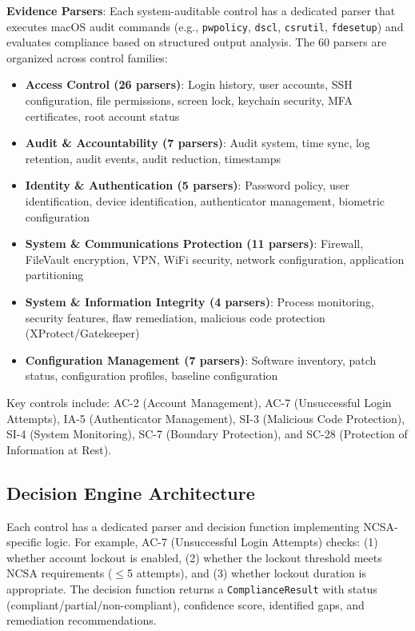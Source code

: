 \documentclass[11pt,conference]{IEEEtran}
\begin{document}
\textbf{Evidence Parsers}: Each system-auditable control has a dedicated parser that executes macOS audit commands (e.g., \texttt{pwpolicy}, \texttt{dscl}, \texttt{csrutil}, \texttt{fdesetup}) and evaluates compliance based on structured output analysis. The 60 parsers are organized across control families:
\begin{itemize}
    \item \textbf{Access Control (26 parsers)}: Login history, user accounts, SSH configuration, file permissions, screen lock, keychain security, MFA certificates, root account status
    \item \textbf{Audit \& Accountability (7 parsers)}: Audit system, time sync, log retention, audit events, audit reduction, timestamps
    \item \textbf{Identity \& Authentication (5 parsers)}: Password policy, user identification, device identification, authenticator management, biometric configuration
    \item \textbf{System \& Communications Protection (11 parsers)}: Firewall, FileVault encryption, VPN, WiFi security, network configuration, application partitioning
    \item \textbf{System \& Information Integrity (4 parsers)}: Process monitoring, security features, flaw remediation, malicious code protection (XProtect/Gatekeeper)
    \item \textbf{Configuration Management (7 parsers)}: Software inventory, patch status, configuration profiles, baseline configuration
\end{itemize}

Key controls include: AC-2 (Account Management), AC-7 (Unsuccessful Login Attempts), IA-5 (Authenticator Management), SI-3 (Malicious Code Protection), SI-4 (System Monitoring), SC-7 (Boundary Protection), and SC-28 (Protection of Information at Rest).

\subsection{Decision Engine Architecture}

Each control has a dedicated parser and decision function implementing NCSA-specific logic. For example, AC-7 (Unsuccessful Login Attempts) checks: (1) whether account lockout is enabled, (2) whether the lockout threshold meets NCSA requirements ($\leq$5 attempts), and (3) whether lockout duration is appropriate. The decision function returns a \texttt{ComplianceResult} with status (compliant/partial/non-compliant), confidence score, identified gaps, and remediation recommendations.
\end{document}
